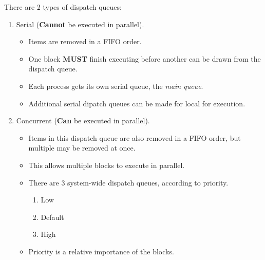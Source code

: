 There are 2 types of dispatch queues:
\begin{enumerate}[noitemsep]
\item Serial (\textbf{Cannot} be executed in parallel).
  \begin{itemize}[noitemsep]
  \item Items are removed in a FIFO order.
  \item One block \textbf{MUST} finish executing before another can be drawn from the dispatch queue.
  \item Each process gets its own serial queue, the \emph{main queue}.
  \item Additional serial dipatch queues can be made for local for execution.
  \end{itemize}
\item Concurrent (\textbf{Can} be executed in parallel).
  \begin{itemize}[noitemsep]
  \item Items in this dispatch queue are also removed in a FIFO order, but multiple may be removed at once.
  \item This allows multiple blocks to execute in parallel.
  \item There are 3 system-wide dispatch queues, according to priority.
    \begin{enumerate}[noitemsep]
    \item Low
    \item Default
    \item High
    \end{enumerate}
  \item Priority is a relative importance of the blocks.
  \end{itemize}
\end{enumerate}

